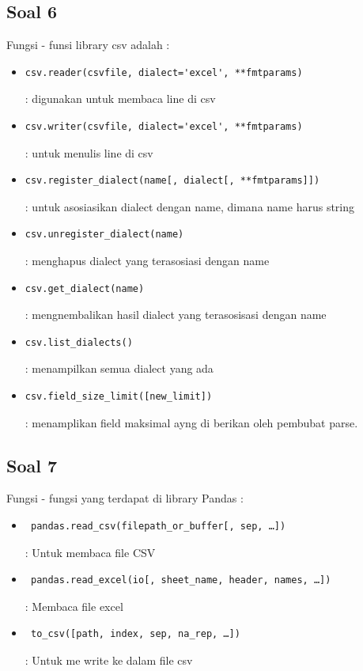 	\subsection{Soal 6}
	Fungsi - funsi library csv adalah :
		\begin{itemize}
			
			\item \begin{verbatim}csv.reader(csvfile, dialect='excel', **fmtparams)\end{verbatim} : digunakan untuk membaca line di csv
			\item \begin{verbatim}csv.writer(csvfile, dialect='excel', **fmtparams)\end{verbatim} : untuk menulis line di csv
			\item \begin{verbatim}csv.register_dialect(name[, dialect[, **fmtparams]]) \end{verbatim}: untuk asosiasikan dialect dengan name, dimana name harus string
			\item \begin{verbatim}csv.unregister_dialect(name)\end{verbatim} : menghapus dialect yang terasosiasi dengan name
			\item \begin{verbatim}csv.get_dialect(name)\end{verbatim} : mengnembalikan hasil dialect yang terasosisasi dengan name
			\item \begin{verbatim}csv.list_dialects() \end{verbatim}: menampilkan semua dialect yang ada
			\item \begin{verbatim}csv.field_size_limit([new_limit])\end{verbatim} : menamplikan field maksimal ayng di berikan oleh pembubat parse.

		\end{itemize}

	\subsection{Soal 7}
	Fungsi - fungsi yang terdapat di library Pandas : 
\begin{itemize}
	\item \begin{verbatim} pandas.read_csv(filepath_or_buffer[, sep, …]) \end{verbatim} : Untuk membaca file CSV
	\item \begin{verbatim} pandas.read_excel(io[, sheet_name, header, names, …])  \end{verbatim} : Membaca file excel 
	\item \begin{verbatim} to_csv([path, index, sep, na_rep, …]) \end{verbatim} : Untuk me write ke dalam file csv	
\end{itemize}
	
